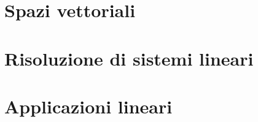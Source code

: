 \documentclass[11pt,a4paper,twoside,draft]{report}
\theoremstyle{plain}%
\theoremstyle{definition}
\theoremstyle{remark}
\begin{document}
\chapter{Spazi vettoriali}



\chapter{Risoluzione di sistemi lineari}



\chapter{Applicazioni lineari}



\newpage

\renewcommand{\listtheoremname}{Indice delle definizioni}
\listoftheorems[ignoreall,show={defn},numwidth=3em]

\renewcommand{\listtheoremname}{Indice dei teoremi}
\listoftheorems[ignoreall,show={theorem},numwidth=3em]

\renewcommand{\listtheoremname}{Indice delle proposizioni}
\listoftheorems[ignoreall,show={prop},numwidth=3em]
\end{document}
